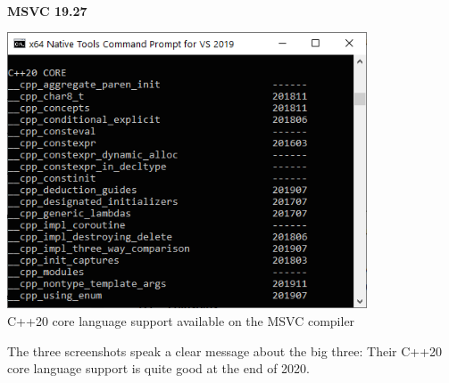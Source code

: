 \hspace*{\fill} \\ %
\noindent
\textbf{MSVC 19.27}

\begin{center}
\includegraphics[width=0.8\textwidth]{content/5/chapter9/images/5.png}\\
C++20 core language support available on the MSVC compiler
\end{center}

The three screenshots speak a clear message about the big three: Their C++20 core language support is quite good at the end of 2020.